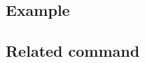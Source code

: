 \documentclass[a4paper]{jarticle}
\begin{document}
\subsection*{Example}
\subsection*{Related command}
\end{document}
